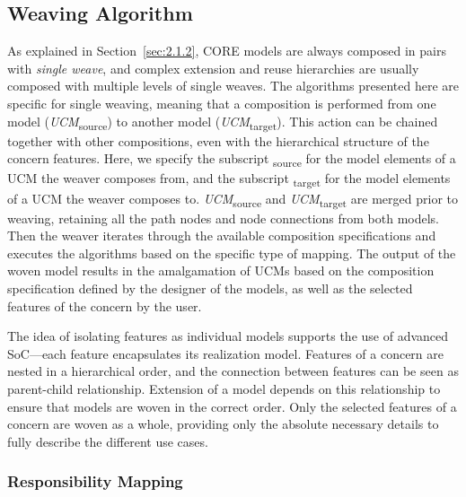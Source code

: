 \subsection{Weaving Algorithm}

As explained in Section~\ref{sec:2.1.2}, CORE models are always composed in pairs with \emph{single weave}, and complex extension and reuse hierarchies are usually composed with multiple levels of single weaves. The algorithms presented here are specific for single weaving, meaning that a composition is performed from one model (\emph{UCM}\textsubscript{source}) to another model (\emph{UCM}\textsubscript{target}). This action can be chained together with other compositions, even with the hierarchical structure of the concern features. Here, we specify the subscript \textsubscript{source} for the model elements of a UCM the weaver composes from, and the subscript \textsubscript{target} for the model elements of a UCM the weaver composes to. \emph{UCM}\textsubscript{source} and \emph{UCM}\textsubscript{target} are merged prior to weaving, retaining all the path nodes and node connections from both models. Then the weaver iterates through the available composition specifications and executes the algorithms based on the specific type of mapping. The output of the woven model results in the amalgamation of UCMs based on the composition specification defined by the designer of the models, as well as the selected features of the concern by the user.

The idea of isolating features as individual models supports the use of advanced SoC---each feature encapsulates its realization model. Features of a concern are nested in a hierarchical order, and the connection between features can be seen as parent-child relationship. Extension of a model depends on this relationship to ensure that models are woven in the correct order. Only the selected features of a concern are woven as a whole, providing only the absolute necessary details to fully describe the different use cases.

\subsubsection{Responsibility Mapping} \label{sec:3.2.1.1}

